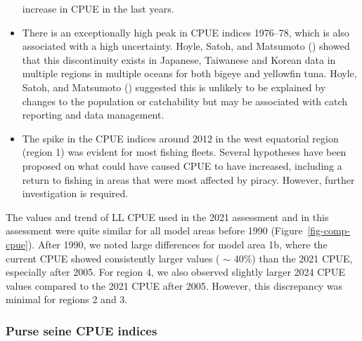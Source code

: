 \documentclass[
]{scrartcl}
\begin{document}
\begin{itemize}
  increase in CPUE in the last years.
\item
  There is an exceptionally high peak in CPUE indices 1976--78, which is
  also associated with a high uncertainty. Hoyle, Satoh, and Matsumoto
  () showed that
  this discontinuity exists in Japanese, Taiwanese and Korean data in
  multiple regions in multiple oceans for both bigeye and yellowfin
  tuna. Hoyle, Satoh, and Matsumoto
  () suggested this
  is unlikely to be explained by changes to the population or
  catchability but may be associated with catch reporting and data
  management.
\item
  The spike in the CPUE indices around 2012 in the west equatorial
  region (region 1) was evident for most fishing fleets. Several
  hypotheses have been proposed on what could have caused CPUE to have
  increased, including a return to fishing in areas that were most
  affected by piracy. However, further investigation is required.
\end{itemize}

The values and trend of LL CPUE used in the 2021 assessment and in this
assessment were quite similar for all model areas before 1990
(Figure~\ref{fig-comp-cpue}). After 1990, we noted large differences for
model area 1b, where the current CPUE showed consistently larger values
( \(\sim\) 40\%) than the 2021 CPUE, especially after 2005. For region
4, we also observed slightly larger 2024 CPUE values compared to the
2021 CPUE after 2005. However, this discrepancy was minimal for regions
2 and 3.

\subsubsection{Purse seine CPUE indices}\label{purse-seine-cpue-indices}
\end{document}
